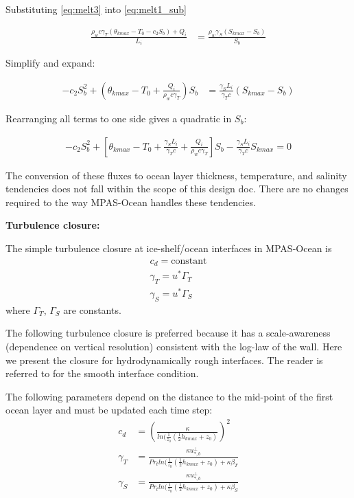 \documentclass[11pt]{report}
\newcommand{\bea}{\begin{eqnarray}}
\newcommand{\eea}{\end{eqnarray}}
\begin{document}
\noindent
Substituting \ref{eq:melt3} into \ref{eq:melt1_sub}

\begin{align}
\frac{\rho_w c \gamma_T (\theta_{kmax} - T_0 - c_2 S_b) + Q_i}{L_i}
    &= \frac{\rho_w \gamma_S (S_{kmax} - S_b)}{S_b}
\end{align}

\noindent
Simplify and expand:

\begin{align}
- c_2 S_b^2
+ \left( \theta_{kmax} - T_0 + \frac{Q_i}{\rho_w c \gamma_T} \right) S_b
    &= \frac{\gamma_S L_i}{\gamma_T c} (S_{kmax} - S_b)
\end{align}

\noindent
Rearranging all terms to one side gives a quadratic in $S_b$:

\begin{align}
- c_2 S_b^2
+ \left[ \theta_{kmax} - T_0
+ \frac{\gamma_S L_i}{\gamma_T c}
+ \frac{Q_i}{\rho_w c \gamma_T} \right] S_b
- \frac{\gamma_S L_i}{\gamma_T c} S_{kmax} = 0
\end{align}

The conversion of these fluxes to ocean layer thickness, temperature, and salinity tendencies does not fall within the scope of this design doc. There are no changes required to the way MPAS-Ocean handles these tendencies.

\textbf{Turbulence closure:}

The simple turbulence closure at ice-shelf/ocean interfaces in MPAS-Ocean is
\bea
    c_d = \text{constant}\\
    \gamma_T = u^* \Gamma_T\\
    \gamma_S = u^* \Gamma_S
\eea
where $\Gamma_T$, $\Gamma_S$ are constants.

The following turbulence closure is preferred because it has a scale-awareness (dependence on vertical resolution) consistent with the log-law of the wall. Here we present the closure for hydrodynamically rough interfaces. The reader is referred to \cite{burchard_vertical_2022} for the smooth interface condition.

The following parameters depend on the distance to the mid-point of the first ocean layer and must be updated each time step:
\bea
    c_d &= (\frac{\kappa}{ln(\frac{1}{z_0}(\frac{1}{2}h_{kmax} + z_0)})^2\\
    \gamma_T &= \frac{\kappa u^{\perp}_{*,b}}{Pr_t ln(\frac{1}{z_0}(\frac{1}{2}h_{kmax} + z_0)+\kappa \beta_T}\\
    \gamma_S &= \frac{\kappa u^{\perp}_{*,b}}{Pr_t ln(\frac{1}{z_0}(\frac{1}{2}h_{kmax} + z_0)+\kappa \beta_S}
\eea
\end{document}

